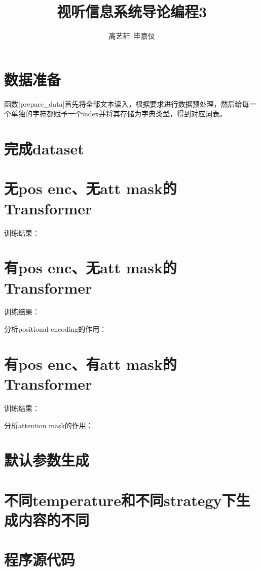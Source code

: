 \documentclass[11pt, a4paper]{article}
\title{\Large{\bf{视听信息系统导论编程3}}}
\author{高艺轩\ 毕嘉仪}
\date{}
\begin{document}
\maketitle
\section{数据准备}
函数|prepare_data|首先将全部文本读入，根据要求进行数据预处理，然后给每一个单独的字符都赋予一个index并将其存储为字典类型，得到对应词表。

\section{完成dataset}

\section{无pos enc、无att mask的Transformer}
训练结果：


\section{有pos enc、无att mask的Transformer}
训练结果：

分析positional encoding的作用：


\section{有pos enc、有att mask的Transformer}
训练结果：

分析attention mask的作用：

\section{默认参数生成}

\section{不同temperature和不同strategy下生成内容的不同}

\section*{程序源代码}
\end{document}
